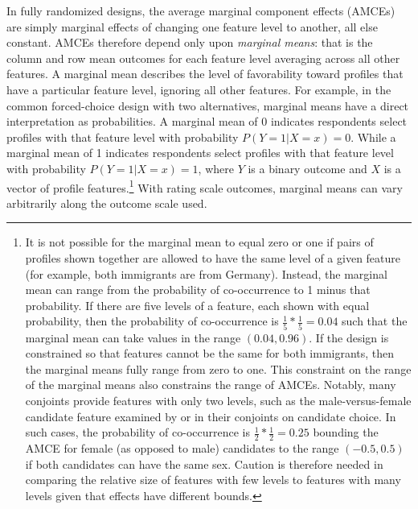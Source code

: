 \documentclass[a4paper,12pt]{article}\usepackage[]{graphicx}\usepackage[]{color}
\begin{document}
In fully randomized designs, the average marginal component effects (AMCEs) are simply marginal effects of changing one feature level to another, all else constant. AMCEs therefore depend only upon \textit{marginal means}: that is the column and row mean outcomes for each feature level averaging across all other features. A marginal mean describes the level of favorability toward profiles that have a particular feature level, ignoring all other features. For example, in the common forced-choice design with two alternatives, marginal means have a direct interpretation as probabilities. A marginal mean of 0 indicates respondents select profiles with that feature level with probability $P(Y=1|X=x) = 0$. While a marginal mean of 1 indicates respondents select profiles with that feature level with probability $P(Y=1|X=x)=1$, where $Y$ is a binary outcome and $X$ is a vector of profile features.\footnote{It is not possible for the marginal mean to equal zero or one if pairs of profiles shown together are allowed to have the same level of a given feature (for example, both immigrants are from Germany). Instead, the marginal mean can range from the probability of co-occurrence to 1 minus that probability. If there are five levels of a feature, each shown with equal probability, then the probability of co-occurrence is $\frac{1}{5}*\frac{1}{5} = 0.04$ such that the marginal mean can take values in the range $(0.04,0.96)$. If the design is constrained so that features cannot be the same for both immigrants, then the marginal means fully range from zero to one. This constraint on the range of the marginal means also constrains the range of AMCEs. Notably, many conjoints provide features with only two levels, such as the male-versus-female candidate feature examined by \citet{TeeleKallaRosenbluth2018} or \citet{HainmuellerHopkinsYamamoto2014} in their conjoints on candidate choice. In such cases, the probability of co-occurrence is $\frac{1}{2}*\frac{1}{2} = 0.25$ bounding the AMCE for female (as opposed to male) candidates to the range $(-0.5, 0.5)$ if both candidates can have the same sex. Caution is therefore needed in comparing the relative size of features with few levels to features with many levels given that effects have different bounds.} With rating scale outcomes, marginal means can vary arbitrarily along the outcome scale used.
\end{document}
